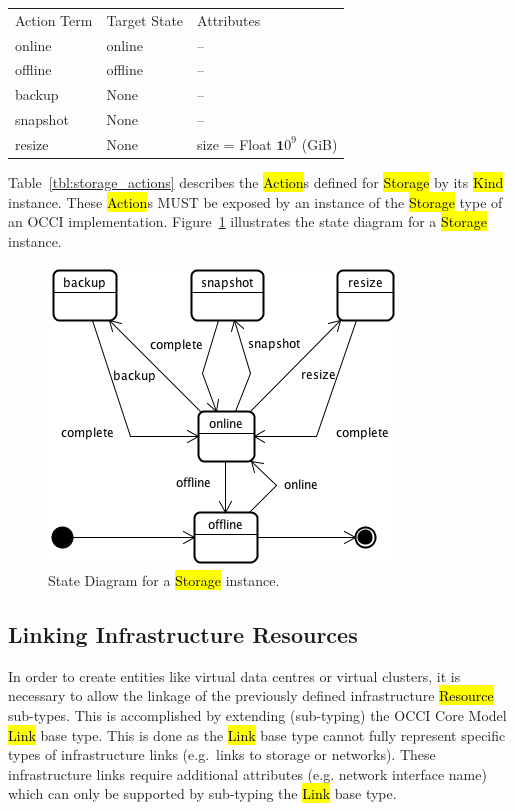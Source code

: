 \documentclass[10pt,a4paper]{article}
\begin{document}
{
	\begin{tabular}{lll}
	\toprule
	Action Term&Target State&Attributes\\
	\colrule
	online & online & --\\
	offline & offline & --\\
	backup & None & --\\
	snapshot & None & --\\
	resize & None & size = Float  ${\mathbf 10}^9$ (GiB)
	\end{tabular}
}

Table~\ref{tbl:storage_actions} describes the \hl{Action}s defined for
\hl{Storage} by its \hl{Kind} instance. These \hl{Action}s MUST be exposed 
by an instance of the \hl{Storage} type of an OCCI implementation. 
Figure~\ref{fig:storage_state} illustrates the state diagram for a \hl{Storage} instance.

\begin{figure}[!h]
	\centering
	\includegraphics[scale=0.4]{figs/storage-state.png}
	\caption{State Diagram for a \hl{Storage} instance.}
	\label{fig:storage_state}
\end{figure}

\subsection{Linking Infrastructure Resources}
In order to create entities like virtual data centres or virtual clusters, it is necessary to allow the linkage
of the previously defined infrastructure \hl{Resource} sub-types. This is accomplished by extending 
(sub-typing) the OCCI Core Model \hl{Link} base type. This is done as the \hl{Link} base type cannot 
fully represent specific types of infrastructure links (e.g.~links to storage or networks).
These infrastructure links require additional attributes (e.g.  network
interface name) which can only be supported by sub-typing the \hl{Link} base
type.
\end{document}

